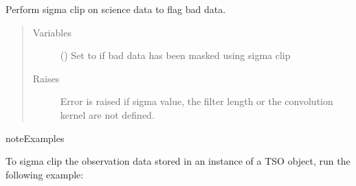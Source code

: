\documentclass[a4paper,10pt,english]{sphinxmanual}
\begin{document}
\begin{fulllineitems}
\begin{fulllineitems}
\begin{quote}
\begin{description}
\end{description}\end{quote}

\end{fulllineitems}


\begin{fulllineitems}
\label{\detokenize{cascade.TSO:cascade.TSO.TSO.TSOSuite.sigma_clip_data}}
Perform sigma clip on science data to flag bad data.
\begin{quote}\begin{description}
\item[{Variables}] \leavevmode
{} () \textendash{} Set to  if bad data has been masked using sigma clip

\item[{Raises}] \leavevmode
{} \textendash{} Error is raised if sigma value, the filter length or
the convolution kernel are not defined.

\end{description}\end{quote}

\begin{sphinxadmonition}{note}{Examples}

To sigma clip the observation data stored in an instance of a TSO
object, run the following example:

%
\begin{sphinxVerbatim}[commandchars=\\\{\}]
\end{sphinxVerbatim}
\end{sphinxadmonition}

\end{fulllineitems}



\end{fulllineitems}
\end{document}
